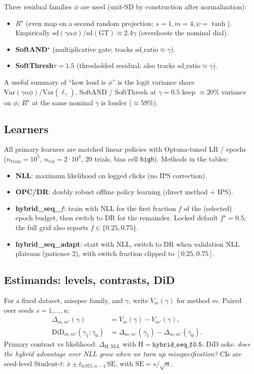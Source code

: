 \documentclass[10pt,a4paper]{article}
\begin{document}
Three residual families $\phi$ are used (unit-SD by construction after
normalization):
\begin{itemize}[leftmargin=1.2em]
\item \textbf{$R^\star$} (even map on a second random projection;
  $s{=}1,m{=}4,\psi{=}\tanh$). Empirically $\mathrm{sd}(\gamma\alpha\phi)/\mathrm{sd}(\text{GT})\approx 2.4\gamma$
  (overshoots the nominal dial).
\item \textbf{SoftAND$^\star$} (multiplicative gate; tracks $\mathrm{sd\_ratio}\approx\gamma$).
\item \textbf{SoftThresh$\tau{=}1.5$} (thresholded residual; also tracks $\mathrm{sd\_ratio}\approx\gamma$).
\end{itemize}
A useful summary of ``how loud is $\phi$'' is the logit variance share
$\mathrm{Var}(\gamma\alpha\phi)/\mathrm{Var}(\ell_\gamma)$. SoftAND / SoftThresh at
$\gamma{=}0.5$ keep $\approx 20\%$ variance on $\phi$; $R^\star$ at the same nominal
$\gamma$ is louder ($\approx 59\%$).

\subsection{Learners}
All primary learners are matched linear policies with Optuna-tuned LR / epochs
($n_{\mathrm{train}}{=}10^5$, $n_{\mathrm{val}}{=}2{\cdot}10^4$, 20 trials, bias cell
\texttt{high}). Methods in the tables:
\begin{itemize}[leftmargin=1.2em]
\item \textbf{NLL}: maximum likelihood on logged clicks (no IPS correction).
\item \textbf{OPC/DR}: doubly robust offline policy learning (direct method + IPS).
\item \textbf{hybrid\_seq\_$f$}: train with NLL for the first fraction $f$ of the
  (selected) epoch budget, then switch to DR for the remainder. Locked default
  $f^\star{=}0.5$; the full grid also reports $f\in\{0.25,0.75\}$.
\item \textbf{hybrid\_seq\_adapt}: start with NLL, switch to DR when validation NLL
  plateaus (patience 2), with switch fraction clipped to $[0.25,0.75]$.
\end{itemize}

\subsection{Estimands: levels, contrasts, DiD}
For a fixed dataset, misspec family, and $\gamma$, write $V_m(\gamma)$ for method $m$.
Paired over seeds $s=1,\dots,n$:
\begin{align}
\Delta_{m,m'}(\gamma)
&= V_m(\gamma)-V_{m'}(\gamma),\\
\mathrm{DiD}_{m,m'}(\gamma_1;\gamma_0)
&= \Delta_{m,m'}(\gamma_1)-\Delta_{m,m'}(\gamma_0).
\end{align}
Primary contrast vs likelihood: $\Delta_{\mathrm{H},\mathrm{NLL}}$ with
$\mathrm{H}=\texttt{hybrid\_seq\_f0.5}$. DiD asks: \emph{does the hybrid advantage
over NLL grow when we turn up misspecification?}
CIs are seed-level Student-$t$:
$\bar x \pm t_{0.975,n-1}\,\mathrm{SE}$, with $\mathrm{SE}=s/\sqrt{n}$.
\end{document}

